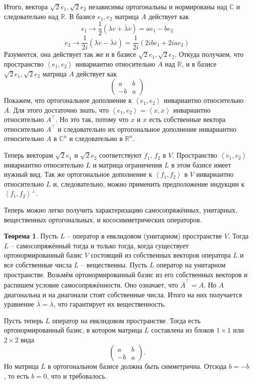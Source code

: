 \documentclass[10pt,a4paper,oneside]{book} %
\theoremstyle{definition}
\newtheorem{thm}{Теорема}
\newcommand{\mb}[1]{\mathbb{#1}}
\newcommand{\ovl}{\overline}
\def\lan{\left\langle }
\def\ran{\right\rangle}
\def\thrm{\begin{thm}}
\def\ethrm{\end{thm}}
\def\pmat{\begin{pmatrix}}
\def\epmat{\end{pmatrix}}
\begin{document}
Итого, вектора $\sqrt{2}e_1,\sqrt{2}e_2$ независимы ортогональны и нормированы над $\mb C$ и следовательно над $\mb R$. В базисе $e_1,e_2$ матрица $A$ действует как 
$$e_1 \to \frac{1}{2}(\lambda v + \ovl{\lambda}\ovl{v})=ae_1 - be_2 $$
$$e_2 \to \frac{1}{2i}(\lambda v - \ovl{\lambda}\ovl{v})=\frac{1}{2i}( 2i b e_1 + 2i  a e_2) $$
Разумеется, она действует так же и в базисе $\sqrt{2}e_1,\sqrt{2}e_2$. Откуда получаем, что пространство $\lan e_1,e_2\ran $ инвариантно относительно $A$ над $\mb R$, и в базисе $\sqrt{2}e_1,\sqrt{2}e_2$ матрица $A$  действует как  
$$\begin{pmatrix}
a & b\\
-b & a
\end{pmatrix}$$
Покажем, что ортогональное дополнение к $\lan e_1, e_2 \ran$ инвариантно относительно $A$. Для этого достаточно знать, что $\lan e_1, e_2\ran = \lan x, \ovl{x} \ran $ инвариантно относительно $A^{\top}$. Но это так, потому что $x$ и $\ovl{x}$ есть собственные вектора  относительно $A^{\top}$ и следовательно их ортогональное дополнение инвариантно относительно $A$ в $\mb C^n$ и следовательно в $\mb R^n$.

Теперь векторам $\sqrt{2}e_1$ и $\sqrt{2}e_2$ соответствуют $f_1$, $f_2$ в $V$. Пространство $\lan v_1,v_2 \ran$ инвариантно относительно $L$ и матрица ограничения $L$ в этом базисе имеет нужный вид. Так же ортогональное дополнение к $\lan f_1,f_2\ran$ в $V$ инвариантно относительно $L$ и, следовательно, можно применить предположение индукции к $\lan f_1,f_2\ran^{\bot}$. 
\endproof






Теперь можно легко получить характеризацию самосопряжённых, унитарных, вещественных ортогональных, и кососимметрических операторов.

\thrm Пусть $L$ -- оператор в евклидовом (унитарном) пространстве $V$. Тогда $L$ -- самосопряжённый тогда и только тогда, когда существует ортонормированный базис $V$ состоящий из собственных векторов оператора $L$ и все собственные числа $L$ -- вещественны.
\proof Пусть $L$ оператор на унитарном пространстве. Возьмём ортонормированный базис из его собственных векторов и распишем условие самосопряжённости. Оно означает, что $\ovl{A}^{\top}=A$. Но $A$ диагональна и на диагонали стоят собственные числа. Итого на них получается уравнение $\ovl{\lambda}=\lambda$, что гарантирует их вещественность.

Пусть теперь  $L$ оператор на евклидовом пространстве. Тогда есть ортонормированный базис, в котором матрица $L$ составлена из блоков $1\times 1$ или $2\times 2$ вида 
$$\pmat a& b \\ -b & a \epmat.$$
Но матрица $L$ в ортогональном базисе должна быть симметрична. Отсюда $b=-b$, то есть $b=0$, что и требовалось.
\endproof
\ethrm
\end{document}
